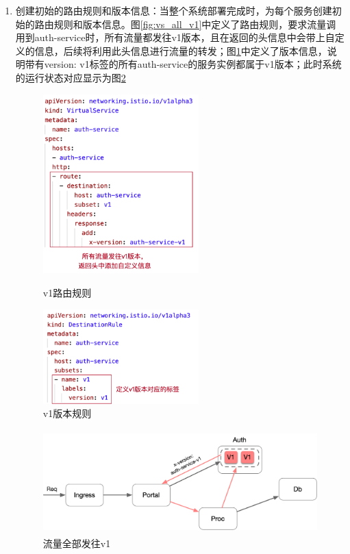 \documentclass[12pt,a4paper]{article}
\begin{document}
\begin{enumerate}
	\item [1.] 创建初始的路由规则和版本信息：当整个系统部署完成时，为每个服务创建初始的路由规则和版本信息。图\ref{fig:vs_all_v1}中定义了路由规则，要求流量调用到auth-service时，所有流量都发往v1版本，且在返回的头信息中会带上自定义的信息，后续将利用此头信息进行流量的转发；图\ref{fig:dr_v1}中定义了版本信息，说明带有{version: v1}标签的所有auth-service的服务实例都属于v1版本；此时系统的运行状态对应显示为图\ref{fig:traffic_all_v1}
	\begin{figure}[htbp]
	\centering
	\begin{minipage}[t]{0.48\textwidth}
	\centering
	\centerline{\includegraphics[width=6cm]{vs_all_v1.png}}
	\caption{v1路由规则}
	\label{fig:vs_all_v1}
	\end{minipage}
	\begin{minipage}[t]{0.48\textwidth}
	\centering
	\centerline{\includegraphics[width=6cm]{dr_v1.png}}
	\caption{v1版本规则}
	\label{fig:dr_v1}
	\end{minipage}
	\end{figure}

	\begin{figure}[ht]
	 \centering
	 \includegraphics[height=4cm]{images/traffic_all_v1.png}
	 \caption{流量全部发往v1}
	 \label{fig:traffic_all_v1}
	\end{figure}


\end{enumerate}
\end{document}
